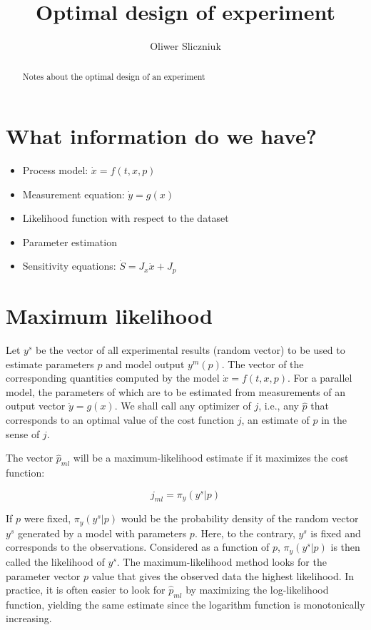 \documentclass[]{scrartcl}
\title{Optimal design of experiment}
\author{Oliwer Sliczniuk}
\begin{document}
\maketitle

\begin{abstract}
Notes about the optimal design of an experiment
\end{abstract}

\section{What information do we have?}

\begin{itemize}
	\item Process model: $\dot{x}=f(t,x,p)$
	\item Measurement equation: $\dot{y}=g(x)$
	\item Likelihood function with respect to the dataset
	\item Parameter estimation
	\item Sensitivity equations: $\dot{S} = J_x \dot{x} + J_p$
\end{itemize}

\section{Maximum likelihood}
Let $y^s$ be the vector of all experimental results (random vector) to be used to estimate parameters $p$ and model output $y^m(p)$. The vector of the corresponding quantities computed by the model $\dot{x}=f(t,x,p)$. For a parallel model, the parameters of which are to be estimated from measurements of an output vector $\dot{y}=g(x)$. We shall call any optimizer of $j$, i.e., any $\hat{p}$ that corresponds to an optimal value of the cost function $j$, an estimate of $p$ in the sense of $j$.

The vector $\hat{p}_{ml}$ will be a maximum-likelihood estimate if it maximizes the cost function:

\begin{equation}
	j_{ml} = \pi_y (y^s|p) 
\end{equation}

If $p$ were fixed, $\pi_y(y^s|p)$ would be the probability density of the random vector $y^s$ generated by a model with parameters $p$. Here, to the contrary, $y^s$ is fixed and corresponds to the observations. Considered as a function of $p$, $\pi_y(y^s|p)$ is then called the likelihood of $y^s$. The maximum-likelihood method looks for the parameter vector $p$ value that gives the observed data the highest likelihood. In practice, it is often easier to look for $\hat{p}_{ml}$ by maximizing the log-likelihood function, yielding the same estimate since the logarithm function is monotonically increasing.
\end{document}
